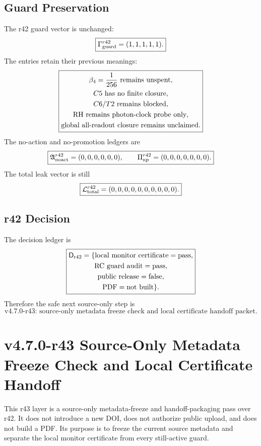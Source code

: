\subsection{Guard Preservation}
\label{subsec:r42-guard-preservation}

The r42 guard vector is unchanged:
\[
\boxed{
\Gamma_{\rm guard}^{r42}=(1,1,1,1,1).
}
\]
The entries retain their previous meanings:
\[
\boxed{
\begin{gathered}
\beta_4={1\over256}\hbox{ remains unspent},\\
C5\hbox{ has no finite closure},\\
C6/T2\hbox{ remains blocked},\\
\mathrm{RH}\hbox{ remains photon-clock probe only},\\
\hbox{global all-readout closure remains unclaimed}.
\end{gathered}
}
\]
The no-action and no-promotion ledgers are
\[
\boxed{
\mathfrak A_{\rm noact}^{r42}=(0,0,0,0,0,0),
\qquad
\Pi_{\rm np}^{r42}=(0,0,0,0,0,0,0).
}
\]
The total leak vector is still
\[
\boxed{
\mathcal L_{\rm total}^{r42}=(0,0,0,0,0,0,0,0,0,0).
}
\]

\subsection{r42 Decision}
\label{subsec:r42-decision}

The decision ledger is
\[
\boxed{
\begin{gathered}
\mathsf D_{\rm r42}
=
\{
\mathrm{local\ monitor\ certificate}=\mathrm{pass},\\
\mathrm{RC\ guard\ audit}=\mathrm{pass},\\
\mathrm{public\ release}=\mathrm{false},\\
\mathrm{PDF}=\mathrm{not\ built}
\}.
\end{gathered}
}
\]
Therefore the safe next source-only step is
\[
\boxed{
\text{v4.7.0-r43: source-only metadata freeze check and local certificate handoff packet.}
}
\]



\section{v4.7.0-r43 Source-Only Metadata Freeze Check and Local Certificate Handoff}
\label{sec:r43-metadata-freeze-handoff}

This r43 layer is a source-only metadata-freeze and handoff-packaging pass over
r42.  It does not introduce a new DOI, does not authorize public upload, and
does not build a PDF.  Its purpose is to freeze the current source metadata and
separate the local monitor certificate from every still-active guard.

